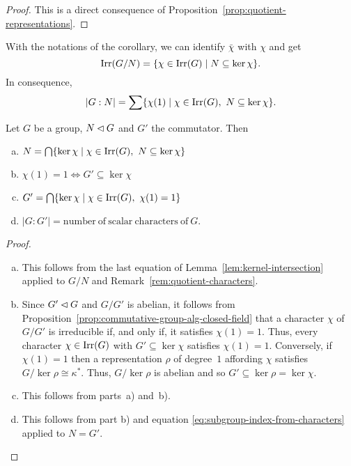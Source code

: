 \begin{proof}
    This is a direct consequence of Proposition~\ref{prop:quotient-representations}.
\end{proof}

\begin{rem}\label{rem:quotient-characters}
    With the notations of the corollary, we can identify $\bar\chi$ with $\chi$ and get
    $$
        \operatorname{Irr}(G/N)=\{\chi\in\operatorname{Irr}(G)
            \mid N\subseteq\ker\chi\}.
    $$
    In consequence,
    \begin{equation}\label{eq:subgroup-index-from-characters}
        |G:N| = \sum\set{\chi(1)\mid \chi\in\op{Irr}(G),\ N\subseteq\ker\chi}.
    \end{equation}
\end{rem}

\begin{cor}
    Let $G$ be a group, $N\lhd G$ and $G'$ the commutator. Then
    \begin{enumerate}[a),font=\upshape]
        \item $N=\bigcap\set{\ker\chi\mid\chi\in\op{Irr}(G),\ N\subseteq\ker\chi}$
        \item $\chi(1)=1\iff G'\subseteq\ker\chi$
        \item $G' = \bigcap\{\ker\chi\mid\chi\in \operatorname{Irr}(G),\ \chi(1)=1\}$
        \item $|G:G'| = \mathrm{number\ of\ scalar\ characters\ of\ } G$.
    \end{enumerate}
\end{cor}

\begin{proof}${}$
    \begin{enumerate}[a)]
        \item This follows from the last equation of Lemma~\ref{lem:kernel-intersection} applied to $G/N$ and Remark~\ref{rem:quotient-characters}.

        \item Since $G'\lhd G$ and $G/G'$ is abelian, it follows from Proposition~\ref{prop:commutative-group-alg-closed-field} that a character $\chi$ of $G/G'$ is irreducible if, and only if, it satisfies $\chi(1)=1$. Thus, every character $\chi\in\operatorname{Irr}(G)$ with $G'\subseteq\ker\chi$ satisfies $\chi(1)=1$. Conversely, if $\chi(1)=1$ then a representation $\rho$ of degree~$1$ affording $\chi$ satisfies $G/\ker\rho\cong\kappa^*$. Thus, $G/\ker\rho$ is abelian and so $G'\subseteq\ker\rho=\ker\chi$.

        \item This follows from parts~a) and~b).

        \item This follows from part b) and equation \eqref{eq:subgroup-index-from-characters} applied to $N=G'$.
    \end{enumerate}
    
\end{proof}

